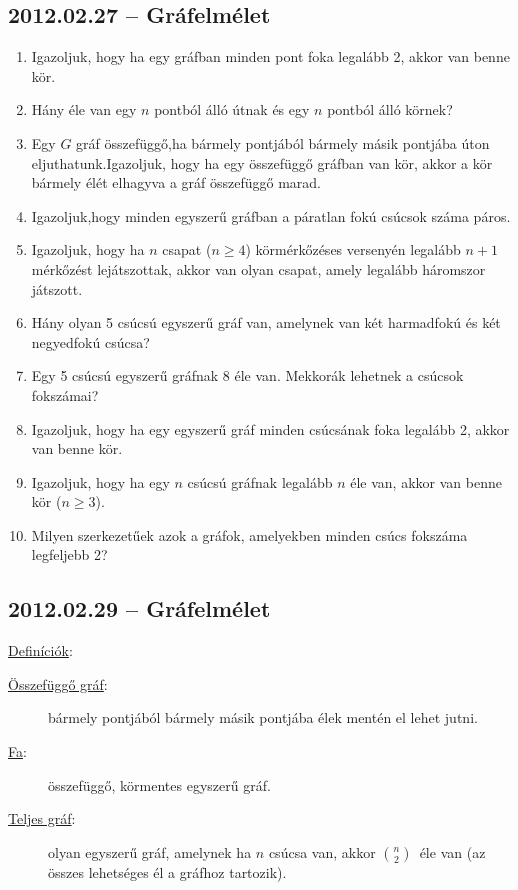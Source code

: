 \subsection*{2012.02.27 -- Gráfelmélet }
\begin{enumerate}

\item Igazoljuk, hogy ha egy gráfban minden pont foka legalább 2, akkor van benne kör. 

\item Hány éle van egy $n$ pontból álló útnak és egy $n$ pontból álló körnek?

\item Egy $G$ gráf összefüggő,ha bármely pontjából bármely másik pontjába úton eljuthatunk.Igazoljuk, hogy ha egy összefüggő gráfban van kör, akkor a kör bármely élét elhagyva a gráf összefüggő marad.

\item Igazoljuk,hogy minden egyszerű gráfban a páratlan fokú csúcsok száma páros.

\item Igazoljuk, hogy ha $n$ csapat ($n\geq 4$) körmérkőzéses versenyén legalább $n+1$ mérkőzést lejátszottak, akkor van olyan csapat, amely legalább háromszor játszott.

\item Hány olyan 5 csúcsú egyszerű gráf van, amelynek van két harmadfokú és két negyedfokú csúcsa?

\item Egy 5 csúcsú egyszerű gráfnak 8 éle van. Mekkorák lehetnek a csúcsok fokszámai?

\item Igazoljuk, hogy ha egy egyszerű gráf minden csúcsának foka legalább 2, akkor van benne kör.

\item Igazoljuk, hogy ha egy $n$ csúcsú gráfnak legalább $n$ éle van, akkor van benne kör ($n\geq 3$).

\item Milyen szerkezetűek azok a gráfok, amelyekben minden csúcs fokszáma legfeljebb 2?
\end{enumerate}


\subsection*{2012.02.29 -- Gráfelmélet }

\underline{Definíciók}:

\begin{description}
\item[\underline{Összefüggő gráf}:] bármely pontjából bármely másik pontjába élek mentén el lehet jutni.

\item[\underline{Fa}:] összefüggő, körmentes egyszerű gráf.

\item[\underline{Teljes gráf}:] olyan egyszerű gráf, amelynek ha $n$ csúcsa van, akkor $\binom{n}{2}$\ éle van (az összes lehetséges él a gráfhoz tartozik).

\end{description}


